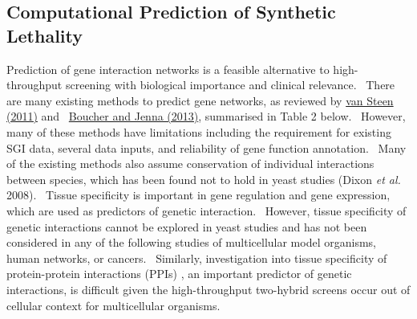 \subsection[Computational Prediction of Synthetic
Lethality]{Computational Prediction of Synthetic Lethality}

Prediction of gene interaction networks is a feasible alternative to
high-throughput screening with biological importance and clinical
relevance. \ There are many existing methods to predict gene networks,
as reviewed by \hyperlink{ENREF104}{van Steen (2011)} and
\ \hyperlink{ENREF16}{Boucher and Jenna (2013)}, summarised in Table 2
below. \ However, many of these methods have limitations including the
requirement for existing SGI data, several data inputs, and reliability
of gene function annotation. \ Many of the existing methods also assume
conservation of individual interactions between species, which has been
found not to hold in yeast studies (Dixon\textit{ et al.} 2008).
\ Tissue specificity is important in gene regulation and gene
expression, which are used as predictors of genetic interaction.
\ However, tissue specificity of genetic interactions cannot be
explored in yeast studies and has not been considered in any of the
following studies of multicellular model organisms, human networks, or
cancers. \ Similarly, investigation into tissue specificity of
protein-protein interactions (PPIs) , an important predictor of genetic
interactions, is difficult given the high-throughput two-hybrid screens
occur out of cellular context for multicellular organisms. \ 


